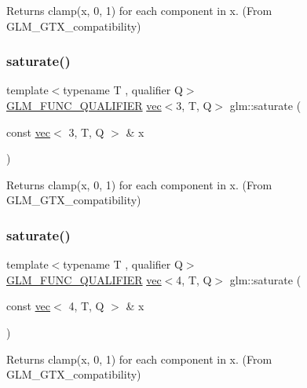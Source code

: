 Returns clamp(x, 0, 1) for each component in x. (From G\+L\+M\+\_\+\+G\+T\+X\+\_\+compatibility) 

\mbox{\label{group__gtx__compatibility_ga39bfe3a421286ee31680d45c31ccc161}} 
\subsubsection{\texorpdfstring{saturate()}{saturate()}\hspace{0.1cm}{\footnotesize\ttfamily [3/4]}}
{\footnotesize\ttfamily template$<$typename T , qualifier Q$>$ \\
\hyperlink{setup_8hpp_a33fdea6f91c5f834105f7415e2a64407}{G\+L\+M\+\_\+\+F\+U\+N\+C\+\_\+\+Q\+U\+A\+L\+I\+F\+I\+ER} \hyperlink{structglm_1_1vec}{vec}$<$3, T, Q$>$ glm\+::saturate (\begin{DoxyParamCaption}\item[{const \hyperlink{structglm_1_1vec}{vec}$<$ 3, T, Q $>$ \&}]{x }\end{DoxyParamCaption})}



Returns clamp(x, 0, 1) for each component in x. (From G\+L\+M\+\_\+\+G\+T\+X\+\_\+compatibility) 

\mbox{\label{group__gtx__compatibility_ga356f8c3a7e7d6376d3d4b0a026407183}} 
\subsubsection{\texorpdfstring{saturate()}{saturate()}\hspace{0.1cm}{\footnotesize\ttfamily [4/4]}}
{\footnotesize\ttfamily template$<$typename T , qualifier Q$>$ \\
\hyperlink{setup_8hpp_a33fdea6f91c5f834105f7415e2a64407}{G\+L\+M\+\_\+\+F\+U\+N\+C\+\_\+\+Q\+U\+A\+L\+I\+F\+I\+ER} \hyperlink{structglm_1_1vec}{vec}$<$4, T, Q$>$ glm\+::saturate (\begin{DoxyParamCaption}\item[{const \hyperlink{structglm_1_1vec}{vec}$<$ 4, T, Q $>$ \&}]{x }\end{DoxyParamCaption})}



Returns clamp(x, 0, 1) for each component in x. (From G\+L\+M\+\_\+\+G\+T\+X\+\_\+compatibility) 

